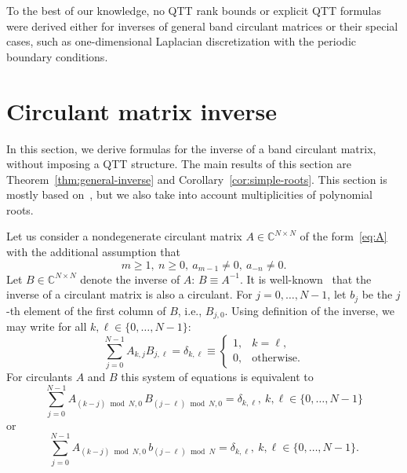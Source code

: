 \documentclass[a4paper]{article}
\begin{document}
To the best of our knowledge, no QTT rank bounds or explicit QTT formulas were derived either for inverses of general band circulant matrices or their special cases, such as one-dimensional Laplacian discretization with the periodic boundary conditions.




	
\section{Circulant matrix inverse} \label{sec:circ}

In this section, we derive formulas for the inverse of a band circulant matrix, without imposing a QTT structure.
The main results of this section are Theorem~\ref{thm:general-inverse} and Corollary~\ref{cor:simple-roots}.
This section is mostly based on~\cite{fuyong2011inverse}, but we also take into account multiplicities of polynomial roots.


	Let us consider a nondegenerate circulant matrix $A \in \mathbb{C}^{N\times N}$ of the form~\eqref{eq:A} with the additional assumption that
	\[
	m \ge 1,~n \ge 0,~a_{m-1} \neq 0,~a_{-n} \neq 0.
	\]
	Let $B \in \mathbb{C}^{N \times N}$ denote the inverse of $A$: $B \equiv A^{-1}$.
	It is well-known~\cite{tyrtyshnikov1997brief} that the inverse of a circulant matrix is also a circulant.
	For $j = 0, \dots, N-1$, let $b_{j}$ be the $j$-th element of the first column of $B$, i.e., $B_{j, 0}$.
	Using definition of the inverse, we may write for all $k,\ell \in \{0,\dots,N-1\}$:
	\[
	\sum_{j=0}^{N-1} A_{k, j}B_{j,\ell}
	=
	\delta_{k,\ell}
	\equiv
	\begin{cases}
		1, &k=\ell, \\
		0, &\text{otherwise}.
	\end{cases}
	\]
	For circulants $A$ and $B$ this system of equations is equivalent to 
	\[
	\sum_{j=0}^{N-1} A_{(k-j) \bmod N, 0}\, B_{(j-\ell)\bmod N, 0}
	=
	\delta_{k,\ell},~k,\ell \in \{0,\dots, N-1\}
	\]
	or 
	\begin{equation}\label{eq:inverse}
	    \sum_{j=0}^{N-1} A_{(k-j) \bmod N, 0}\,b_{(j-\ell)\bmod N}
	=
	\delta_{k,\ell},
	~k,\ell \in \{0,\dots,N-1\}.
	\end{equation}
	
\end{document}
